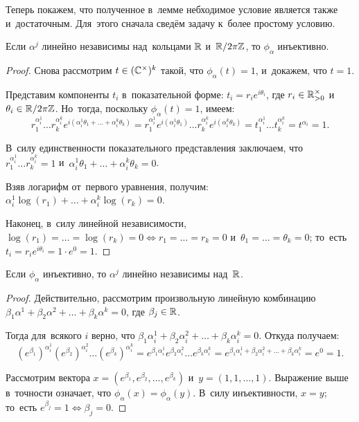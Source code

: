 \documentclass{article}
\begin{document}
Теперь покажем, что полученное в~лемме небходимое условие является также и~достаточным.
Для~этого сначала сведём задачу к~более простому условию.

\begin{lemma*}
    Если $\alpha^j$ линейно независимы над~кольцами $\mathbb{R}$ и~$\mathbb{R} / 2 \pi \mathbb{Z}$, то $\phi_\alpha$ инъективно.
\end{lemma*}

\begin{proof}
    Снова рассмотрим $t \in (\mathbb{C}^\times)^k$ такой, что $\phi_\alpha(t) = 1$, и~докажем, что $t = 1$.

    Представим компоненты $t_i$ в~показательной форме: $t_i = r_i e^{i {\theta_i}}$, где $r_i \in \mathbb{R}_{>0}^\times$ и~$\theta_i \in \mathbb{R} / 2 \pi \mathbb{Z}$.
    Но~тогда, поскольку $\phi_\alpha(t) = 1$, имеем:
    $$
        r_1^{\alpha_i^1} \ldots r_k^{\alpha_i^k} e^{i(\alpha_i^1 \theta_1 + \ldots + \alpha_i^k \theta_k)} =
        r_1^{\alpha_i^1} e^{i(\alpha_i^1 \theta_1)} \ldots r_k^{\alpha_i^k} e^{i(\alpha_i^k \theta_k)} =
        t_1^{\alpha_i^1} \ldots t_k^{\alpha_i^k} =
        t^{\alpha_i} = 1.
    $$

    В~силу единственности показательного представления заключаем, что
    $r_1^{\alpha_i^1} \ldots r_k^{\alpha_i^k} = 1$ и~$\alpha_i^1 \theta_1 + \ldots + \alpha_i^k \theta_k = 0$.

    Взяв логарифм от~первого уравнения, получим:
    $ \alpha_i^1 \log(r_1) + \ldots + \alpha_i^k \log(r_k) = 0$.

    Наконец, в~силу линейной независимости, $\log(r_1) = \ldots = \log(r_k) = 0 \Leftrightarrow r_1 = \ldots = r_k = 0$
    и~$\theta_1 = \ldots = \theta_k = 0$; то~есть $t_i = r_i e^{i \theta_i} = 1 \cdot e^0 = 1$.
\end{proof}

\begin{lemma*}
    Если $\phi_\alpha$ инъективно, то $\alpha^j$ линейно независимы над~$\mathbb{R}$.
\end{lemma*}

\begin{proof}
    Действительно, рассмотрим произвольную линейную комбинацию $ \beta_1 \alpha^1 + \beta_2 \alpha^2 + \ldots + \beta_k \alpha^k = 0$,
    где $\beta_j \in \mathbb{R}$.

    Тогда для~всякого $i$ верно, что $ \beta_1 \alpha_i^1 + \beta_2 \alpha_i^2 + \ldots + \beta_k \alpha_i^k = 0$.
    Откуда получаем:
    $$
        (e^{\beta_1})^{\alpha_i^1} (e^{\beta_2})^{\alpha_i^2} \ldots (e^{\beta_k})^{\alpha_i^k} =
        e^{\beta_1 \alpha_i^1} e^{\beta_2 \alpha_i^2} \ldots e^{\beta_k \alpha_i^k} =
        e^{\beta_1 \alpha_i^1 + \beta_2 \alpha_i^2 + \ldots + \beta_k \alpha_i^k} =
        e^0 = 1.
    $$

    Рассмотрим вектора $x = (e^{\beta_1}, e^{\beta_2}, \ldots, e^{\beta_k})$ и~$y = (1, 1, \ldots, 1)$.
    Выражение выше в~точности означает, что $\phi_\alpha(x) = \phi_\alpha(y)$. В~силу инъективности, $x = y$;
    то~есть $e^{\beta_j} = 1 \Leftrightarrow \beta_j = 0$.
\end{proof}
\end{document}
